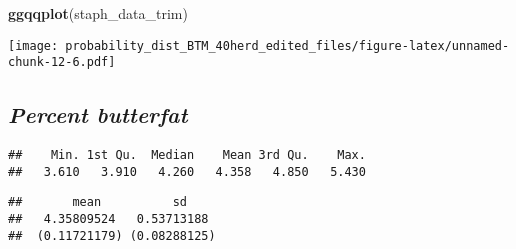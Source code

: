 \documentclass[]{article}
\newenvironment{Shaded}{\begin{snugshade}}{\end{snugshade}}
\newcommand{\KeywordTok}[1]{\textcolor[rgb]{0.13,0.29,0.53}{\textbf{#1}}}
\newcommand{\StringTok}[1]{\textcolor[rgb]{0.31,0.60,0.02}{#1}}
\newcommand{\CommentTok}[1]{\textcolor[rgb]{0.56,0.35,0.01}{\textit{#1}}}
\newcommand{\OperatorTok}[1]{\textcolor[rgb]{0.81,0.36,0.00}{\textbf{#1}}}
\newcommand{\NormalTok}[1]{#1}
\begin{document}
\begin{Shaded}
\begin{Highlighting}[]
\KeywordTok{ggqqplot}\NormalTok{(staph_data_trim)}
\end{Highlighting}
\end{Shaded}

\texttt{[image: probability\_dist\_BTM\_40herd\_edited\_files/figure-latex/unnamed-chunk-12-6.pdf]}

\subsection{\texorpdfstring{\textbf{\emph{Percent
butterfat}}}{Percent butterfat}}\label{percent-butterfat}

\begin{Shaded}
\end{Shaded}

\begin{verbatim}
##    Min. 1st Qu.  Median    Mean 3rd Qu.    Max. 
##   3.610   3.910   4.260   4.358   4.850   5.430
\end{verbatim}

\begin{Shaded}
\end{Shaded}

\begin{verbatim}
##       mean          sd    
##   4.35809524   0.53713188 
##  (0.11721179) (0.08288125)
\end{verbatim}
\end{document}
